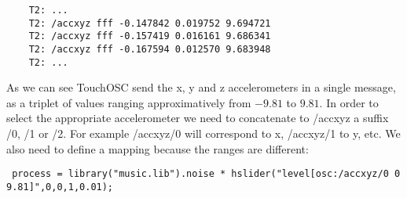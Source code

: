 \begin{lstlisting}
	T2: ...
	T2: /accxyz fff -0.147842 0.019752 9.694721
	T2: /accxyz fff -0.157419 0.016161 9.686341
	T2: /accxyz fff -0.167594 0.012570 9.683948
	T2: ...
\end{lstlisting}

As we can see TouchOSC send the x, y and z accelerometers in a single message, as a triplet of values ranging approximatively from $-9.81$ to $9.81$. In order to select the appropriate accelerometer we need to concatenate to /accxyz a suffix /0, /1 or /2. For example /accxyz/0 will correspond to x, /accxyz/1 to y, etc. We also need to define a mapping because the ranges are different:

\begin{lstlisting}
 process = library("music.lib").noise * hslider("level[osc:/accxyz/0 0 9.81]",0,0,1,0.01);
\end{lstlisting}

